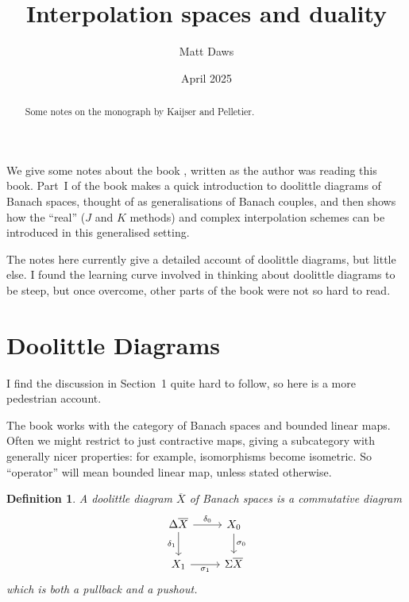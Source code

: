 \documentclass[a4paper,11pt]{article}
\theoremstyle{plain}
\newtheorem{definition}[proposition]{Definition}
\theoremstyle{remark}
\begin{document}
\title{Interpolation spaces and duality}
\author{Matt Daws}
\date{April 2025}
\maketitle

\begin{abstract}
Some notes on the monograph by Kaijser and Pelletier.
\end{abstract}

We give some notes about the book \cite{KP_InterpolationFunctorsDuality}, written as the author was reading this book.  Part~I of the book makes a quick introduction to doolittle diagrams of Banach spaces, thought of as generalisations of Banach couples, and then shows how the ``real'' ($J$ and $K$ methods) and complex interpolation schemes can be introduced in this generalised setting.

The notes here currently give a detailed account of doolittle diagrams, but little else.  I found the learning curve involved in thinking about doolittle diagrams to be steep, but once overcome, other parts of the book were not so hard to read.



\section{Doolittle Diagrams}

I find the discussion in Section~1 quite hard to follow, so here is a more pedestrian account.

The book works with the category of Banach spaces and bounded linear maps.  Often we might restrict to just contractive maps, giving a subcategory with generally nicer properties: for example, isomorphisms become isometric.  So ``operator'' will mean bounded linear map, unless stated otherwise.

\begin{definition}
A \emph{doolittle diagram} $\overline{X}$ of Banach spaces is a commutative diagram
\[ \begin{tikzcd}
\Delta\overline X \arrow[r, "\delta_0"] \arrow[d, "\delta_1"'] & X_0 \arrow[d, "\sigma_0"] \\
X_1 \arrow[r, "\sigma_1"'] & \Sigma\overline X
\end{tikzcd}
\]
which is both a pullback and a pushout.
\end{definition}
\end{document}
